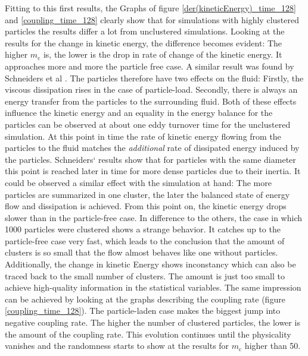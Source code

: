 \documentclass[11pt,a4paper,openany,oneside,parskip=half*]{article}
\begin{document}
\newline
Fitting to this first results, the Graphs of figure \ref{der(kineticEnergy)_time_128} and \ref{coupling_time_128} clearly show that for simulations with highly clustered particles the results differ a lot from unclustered simulations. Looking at the results for the change in kinetic energy, the difference becomes evident: The higher $ m_\mathrm{c} $ is, the lower is the drop in rate of change of the kinetic energy. It approaches more and more the particle free case. A similar result was found by Schneiders et al \cite{Schneiders2017}. The particles therefore have two effects on the fluid: Firstly, the viscous dissipation rises in the case of particle-load. Secondly, there is always an energy transfer from the particles to the surrounding fluid. Both of these effects influence the kinetic energy and an equality in the energy balance for the particles can be observed at about one eddy turnover time for the unclustered simulation. At this point in time the rate of kinetic energy flowing from the particles to the fluid matches the \textit{additional} rate of dissipated energy induced by the particles.
\newline
Schneiders` results show that for particles with the same diameter this point is reached later in time for more dense particles due to their inertia. It could be observed a similar effect with the simulation at hand: The more particles are summarized in one cluster, the later the balanced state of energy flow and dissipation is achieved. From this point on, the kinetic energy drops slower than in the particle-free case.
\newline
In difference to the others, the case in which 1000 particles were clustered shows a strange behavior. It catches up to the particle-free case very fast, which leads to the conclusion that the amount of clusters is so small that the flow almost behaves like one without particles. Additionally, the change in kinetic Energy shows inconstancy which can also be traced back to the small number of clusters. The amount is just too small to achieve high-quality information in the statistical variables. 
\newline
The same impression can be achieved by looking at the graphs describing the coupling rate (figure \ref{coupling_time_128}). The particle-laden case makes the biggest jump into negative coupling rate. The higher the number of clustered particles, the lower is the amount of the coupling rate. This evolution continues until the physicality vanishes and the randomness starts to show at the results for $m_\mathrm{c}$ higher than 50. 
\end{document}
